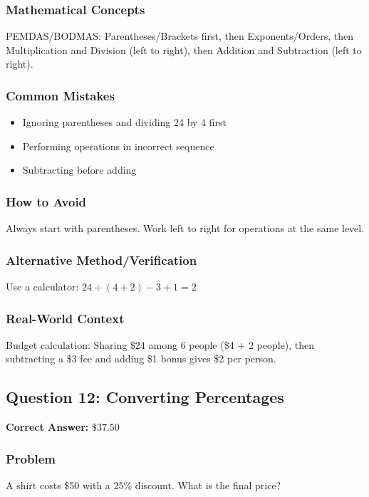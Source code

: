 \documentclass[12pt,a4paper]{article}
\begin{document}
\subsubsection*{Mathematical Concepts}
PEMDAS/BODMAS: Parentheses/Brackets first, then Exponents/Orders, then Multiplication and Division (left to right), then Addition and Subtraction (left to right).

\subsubsection*{Common Mistakes}
\begin{itemize}
    \item Ignoring parentheses and dividing 24 by 4 first
    \item Performing operations in incorrect sequence
    \item Subtracting before adding
\end{itemize}

\subsubsection*{How to Avoid}
Always start with parentheses. Work left to right for operations at the same level.

\subsubsection*{Alternative Method/Verification}
Use a calculator: $24 \div (4 + 2) - 3 + 1 = 2$ 

\subsubsection*{Real-World Context}
Budget calculation: Sharing \$24 among 6 people (\$4 + 2 people), then subtracting a \$3 fee and adding \$1 bonus gives \$2 per person.

\vspace{0.5cm}

\subsection*{Question 12: Converting Percentages}

\textbf{Correct Answer:} $\$37.50$

\subsubsection*{Problem}
A shirt costs \$50 with a 25\% discount. What is the final price?
\end{document}
